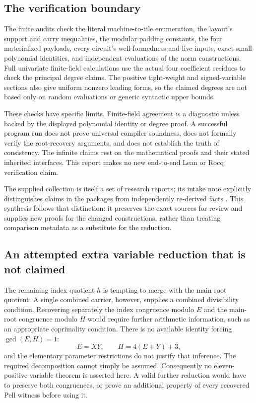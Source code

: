\documentclass[11pt,letterpaper]{article}
\theoremstyle{remark}
\begin{document}
\subsection{The verification boundary}

The finite audits check the literal machine-to-tile enumeration, the
layout's support and carry inequalities, the modular padding constants,
the four materialized payloads, every circuit's well-formedness and live
inputs, exact small polynomial identities, and independent evaluations
of the norm constructions.  Full univariate finite-field calculations
use the actual four coefficient residues to check the principal degree
claims.  The positive tight-weight and signed-variable sections also
give uniform nonzero leading forms, so the claimed degrees are not based
only on random evaluations or generic syntactic upper bounds.

These checks have specific limits.  Finite-field agreement is a
diagnostic unless backed by the displayed polynomial identity or degree
proof.  A successful program run does not prove universal compiler
soundness, does not formally verify the root-recovery arguments, and does
not establish the truth of consistency.  The infinite claims rest on
the mathematical proofs and their stated inherited interfaces.  This
report makes no new end-to-end Lean or Rocq verification claim.

The supplied collection is itself a set of research reports; its intake
note explicitly distinguishes claims in the packages from independently
re-derived facts \cite{collection}.  This synthesis follows that
distinction: it preserves the exact sources for review and supplies new
proofs for the changed constructions, rather than treating comparison
metadata as a substitute for the reduction.

\subsection{An attempted extra variable reduction that is not claimed}

The remaining index quotient $h$ is tempting to merge with the main-root
quotient.  A single combined carrier, however, supplies a combined
divisibility condition.  Recovering separately the index congruence
modulo $E$ and the main-root congruence modulo $H$ would require further
arithmetic information, such as an appropriate coprimality condition.
There is no available identity forcing $\gcd(E,H)=1$:
\[
 E=XY,\qquad H=4(E+Y)+3,
\]
and the elementary parameter restrictions do not justify that inference.
The required decomposition cannot simply be assumed.  Consequently no
eleven-positive-variable theorem is asserted here.  A valid further
reduction would have to preserve both congruences, or prove an additional
property of every recovered Pell witness before using it.
\end{document}
